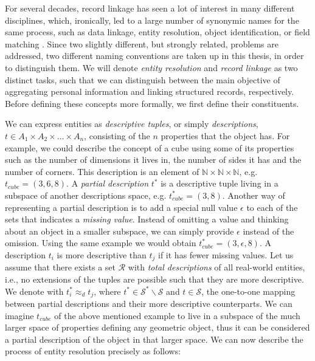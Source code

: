 For several decades, record linkage has seen a lot of interest in many different disciplines, which, ironically, led to a large number of synonymic names for the same process, such as data linkage, entity resolution, object identification, or field matching \citep{Christen2012}.
Since two slightly different, but strongly related, problems are addressed, two different naming conventions are taken up in this thesis, in order to distinguish them.
We will denote \emph{entity resolution} and \emph{record linkage} as two distinct tasks, such that we can distinguish between the main objective of aggregating personal information and linking structured records, respectively.
Before defining these concepts more formally, we first define their constituents.

We can express entities as \emph{descriptive tuples}, or simply \emph{descriptions}, $t \in A_{1} \times A_{2} \times \dots \times A_{n}$, consisting of the $n$ properties that the object has.
For example, we could describe the concept of a cube using some of its properties such as the number of dimensions it lives in, the number of sides it has and the number of corners.
This description is an element of $\mathbb{N} \times \mathbb{N} \times \mathbb{N}$, e.g. $t_{cube}=(3, 6, 8)$.
A \emph{partial description} $t^{*}$ is a descriptive tuple living in a subspace of another descriptions space, e.g. $t_{cube}^{*}=(3, 8)$.
Another way of representing a partial description is to add a special null value $\epsilon$ to each of the sets that indicates a \emph{missing value}.
Instead of omitting a value and thinking about an object in a smaller subspace, we can simply provide $\epsilon$ instead of the omission.
Using the same example we would obtain $t_{cube}^{*}=(3, \epsilon, 8)$.
A description $t_i$ is more descriptive than $t_j$ if it has fewer missing values.
Let us assume that there exists a set $\mathcal{R}$ with \emph{total descriptions} of all real-world entities, i.e., no extensions of the tuples are possible such that they are more descriptive.
We denote with $t_{i}^{*} \approx_{d} t_{j}$, where $t^{*} \in \mathcal{S}^{*} \backslash \mathcal{S}$ and $t \in \mathcal{S}$, the one-to-one mapping between partial descriptions and their more descriptive counterparts.
We can imagine $t_{cube}$ of the above mentioned example to live in a subspace of the much larger space of properties defining any geometric object, thus it can be considered a partial description of the object in that larger space.
We can now describe the process of entity resolution precisely as follows:

